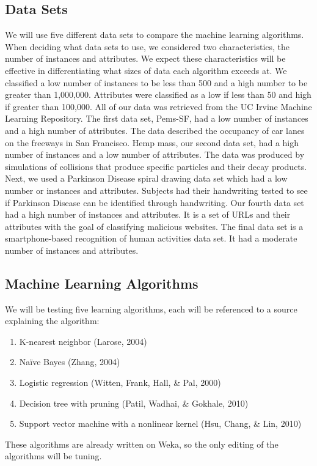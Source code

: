 \documentclass[11pt]{article} %
\begin{document}
\subsection{Data Sets}
We will use five different data sets to compare the machine learning algorithms.  When deciding what data sets to use, we considered two characteristics, the number of instances and attributes.  We expect these characteristics will be effective in differentiating what sizes of data each algorithm exceeds at.  We classified a low number of instances to be less than 500 and a high number to be greater than 1,000,000.  Attributes were classified as a low if less than 50 and high if greater than 100,000.  All of our data was retrieved from the UC Irvine Machine Learning Repository.  The first data set, Pems-SF, had a low number of instances and a high number of attributes.  The data described the occupancy of car lanes on the freeways in San Francisco.  Hemp mass, our second data set, had a high number of instances and a low number of attributes.  The data was produced by simulations of collisions that produce specific particles and their decay products. Next, we used a Parkinson Disease spiral drawing data set which had a low number or instances and attributes.  Subjects had their handwriting tested to see if Parkinson Disease can be identified through handwriting.  Our fourth data set had a high number of instances and attributes.  It is a set of URLs and their attributes with the goal of classifying malicious websites.  The final data set is a smartphone-based recognition of human activities data set.  It had a moderate number of instances and attributes.

\subsection{Machine Learning Algorithms}
We will be testing five learning algorithms, each will be referenced to a source explaining the algorithm:
\begin{enumerate}
	\item K-nearest neighbor (Larose, 2004)
	\item Na\"{i}ve Bayes (Zhang, 2004)
	\item Logistic regression (Witten, Frank, Hall, \& Pal, 2000)
	\item Decision tree with pruning (Patil, Wadhai, \& Gokhale, 2010)
	\item Support vector machine with a nonlinear kernel (Hsu, Chang, \& Lin, 2010)
\end{enumerate}
These algorithms are already written on Weka, so the only editing of the algorithms will be tuning.
\end{document}
